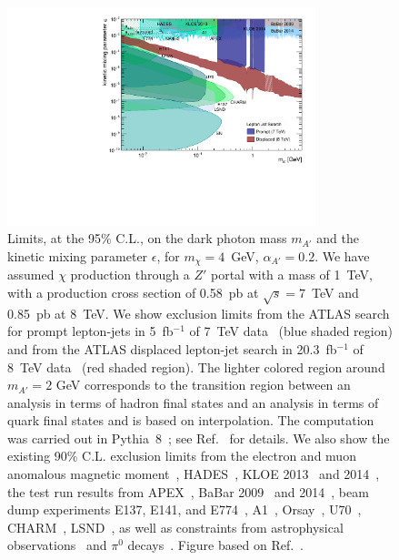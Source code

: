 \begin{figure}
  \begin{center}
    \includegraphics[width=0.8\textwidth]{figures/DS_DarkPhoton_Constraints.pdf}
  \end{center}
  \vspace{-0.7cm}
  \caption{
    Limits, at the 95\% C.L., on the dark photon mass $m_{A'}$ and the kinetic mixing parameter $\epsilon$, for $m_\chi = 4$~GeV, $\alpha_{A'} = 0.2$. We have assumed $\chi$ production through a $Z'$ portal with a mass of 1~TeV, with a production cross section of 0.58~pb at $\sqrt{s} = 7$~TeV and 0.85~pb at 8~TeV. We show exclusion limits from the ATLAS search for prompt lepton-jets in 5~fb$^{-1}$ of 7~TeV data~\cite{Aad:2012qua} (blue shaded region) and from the ATLAS displaced lepton-jet search in 20.3~fb$^{-1}$ of 8~TeV data~\cite{Aad:2014yea} (red shaded region). The lighter colored region around $m_{A'}=2$ GeV corresponds to the transition region between an analysis in terms of hadron final states and an analysis in terms of quark final states and is based on interpolation. The computation was carried out in Pythia~8~\cite{Carloni:2010tw,Carloni:2011kk,Sjostrand:2014zea}; see Ref.~\cite{Buschmann:2015awa} for details. We also show the existing 90\% C.L. exclusion limits from the electron and muon anomalous magnetic moment~\cite{Pospelov:2008zw,Davoudiasl:2012ig,Endo:2012hp}, HADES~\cite{Agakishiev:2013fwl}, KLOE 2013~\cite{Babusci:2012cr} and 2014~\cite{Babusci:2014sta}, the test run results from APEX~\cite{Abrahamyan:2011gv}, BaBar 2009~\cite{Aubert:2009cp} and 2014~\cite{Lees:2014xha}, beam dump experiments E137, E141, and E774~\cite{Blumlein:2011mv,Bjorken:2009mm,Bross:1989mp}, A1~\cite{Merkel:2011ze}, Orsay~\cite{Davier:1989wz}, U70~\cite{Blumlein:2013cua}, CHARM~\cite{Gninenko:2012eq}, LSND~\cite{Essig:2010gu}, as well as constraints from astrophysical observations~\cite{Dent:2012mx,Dreiner:2013mua} and $\pi^0$ decays~\cite{CERNNA48/2:2015lha}. Figure based on Ref.~\cite{Buschmann:2015awa}.}
  \label{fig:radiating-dm-limits}
\end{figure}

